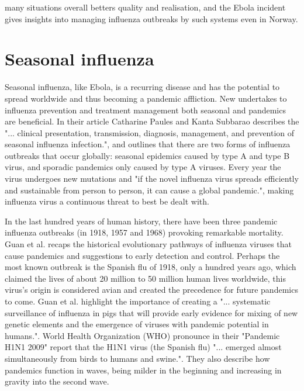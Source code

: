 many situations overall betters quality and realisation, and the Ebola incident gives insights into managing influenza outbreaks by such systems even in Norway.




\section{Seasonal influenza}
Seasonal influenza, like Ebola, is a recurring disease and has the potential to spread worldwide and thus becoming a pandemic affliction. New undertakes to influenza prevention and treatment management both seasonal and pandemics are beneficial. In their article Catharine Paules and Kanta Subbarao\cite{article_Paules} describes the "... clinical presentation, transmission, diagnosis, management, and prevention of seasonal influenza infection.", and outlines that there are two forms of influenza outbreaks that occur globally: seasonal epidemics caused by type A and type B virus, and sporadic pandemics only caused by type A viruses. Every year the virus undergoes new mutations and "if the novel influenza virus spreads efficiently and sustainable from person to person, it can cause a global pandemic.", making influenza virus a continuous threat to best be dealt with.

In the last hundred years of human history, there have been three pandemic influenza outbreaks (in 1918, 1957 and 1968) provoking remarkable mortality. Guan et al.\cite{guan2010emergence} recaps the historical evolutionary pathways of influenza viruses that cause pandemics and suggestions to early detection and control. Perhaps the most known outbreak is the Spanish flu of 1918, only a hundred years ago, which claimed the lives of about 20 million to 50 million human lives worldwide, this virus's origin is considered avian and created the precedence for future pandemics to come. Guan et al. highlight the importance of creating a "... systematic surveillance of influenza in pigs that will provide early evidence for mixing of new genetic elements and the emergence of viruses with pandemic potential in humans.". World Health Organization (WHO) pronounce in their "Pandemic H1N1 2009"\cite{world2009pandemic} report that the H1N1 virus (the Spanish flu) "... emerged almost simultaneously from birds to humans and swine.". They also describe how pandemics function in waves, being milder in the beginning and increasing in gravity into the second wave.

